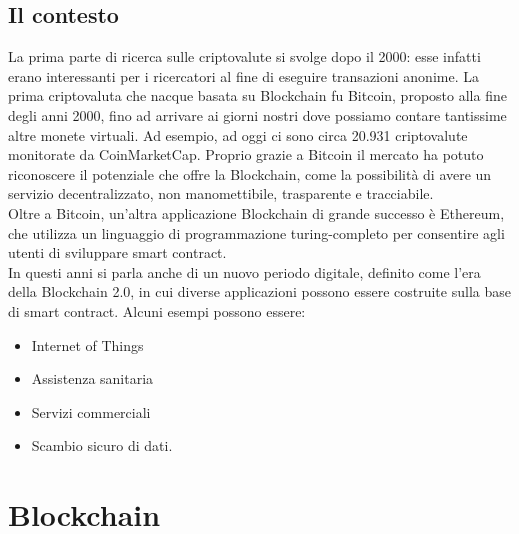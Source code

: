 \documentclass[a4paper,11pt]{report}
\begin{document}
\section{Il contesto}
La prima parte di ricerca sulle criptovalute si svolge dopo il 2000: esse infatti erano interessanti per i ricercatori al fine di eseguire transazioni anonime.
La prima criptovaluta che nacque basata su Blockchain fu Bitcoin, proposto alla fine degli anni 2000, fino ad arrivare ai giorni nostri dove possiamo contare tantissime altre monete virtuali. 
Ad esempio, ad oggi ci sono circa 20.931 criptovalute monitorate da CoinMarketCap. Proprio grazie a Bitcoin il mercato ha potuto riconoscere il potenziale che offre la Blockchain, come la possibilità di avere un servizio decentralizzato, non manomettibile, trasparente e tracciabile.\\
Oltre a Bitcoin, un'altra applicazione Blockchain di grande successo è Ethereum, che utilizza un linguaggio di programmazione turing-completo per consentire agli utenti di sviluppare smart contract.\\
In questi anni si parla anche di un nuovo periodo digitale, definito come l'era della Blockchain 2.0, in cui diverse applicazioni possono essere costruite sulla base di smart contract. Alcuni esempi possono essere:
\begin{itemize}
\item Internet of Things
\item Assistenza sanitaria
\item Servizi commerciali
\item Scambio sicuro di dati.
\end{itemize}

\chapter{Blockchain}
\end{document}
